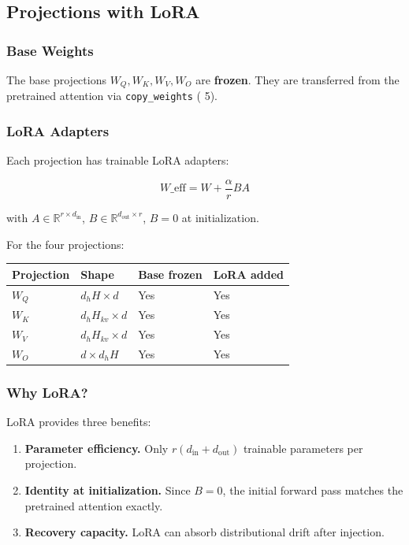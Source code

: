 \subsection{Projections with LoRA}

\subsubsection{Base Weights}

The base projections $W_Q, W_K, W_V, W_O$ are \textbf{frozen}. They are 
transferred from the pretrained attention via \texttt{copy\_weights} ( 5).

\subsubsection{LoRA Adapters}

Each projection has trainable LoRA adapters:

\[
W\_\text{eff} = W + \frac{\alpha}{r} B A
\tag{4.1}
\]

with $A \in \mathbb{R}^{r \times d_\text{in}}$, $B \in \mathbb{R}^{d_\text{out} \times r}$, 
$B = 0$ at initialization.

For the four projections:

\begin{table}[H]
\centering
\small
\begin{tabular}{llll}
\toprule
\textbf{Projection} & \textbf{Shape} & \textbf{Base frozen} & \textbf{LoRA added} \\
\midrule
$W_Q$ & $d_h H \times d$ & Yes & Yes \\
$W_K$ & $d_h H_{kv} \times d$ & Yes & Yes \\
$W_V$ & $d_h H_{kv} \times d$ & Yes & Yes \\
$W_O$ & $d \times d_h H$ & Yes & Yes \\
\bottomrule
\end{tabular}
\end{table}

\subsubsection{Why LoRA?}

LoRA provides three benefits:

\begin{enumerate}
\item \textbf{Parameter efficiency.} Only $r(d_\text{in} + d_\text{out})$ trainable
  parameters per projection.
\item \textbf{Identity at initialization.} Since $B = 0$, the initial forward pass
  matches the pretrained attention exactly.
\item \textbf{Recovery capacity.} LoRA can absorb distributional drift after
  injection.

\end{enumerate}
